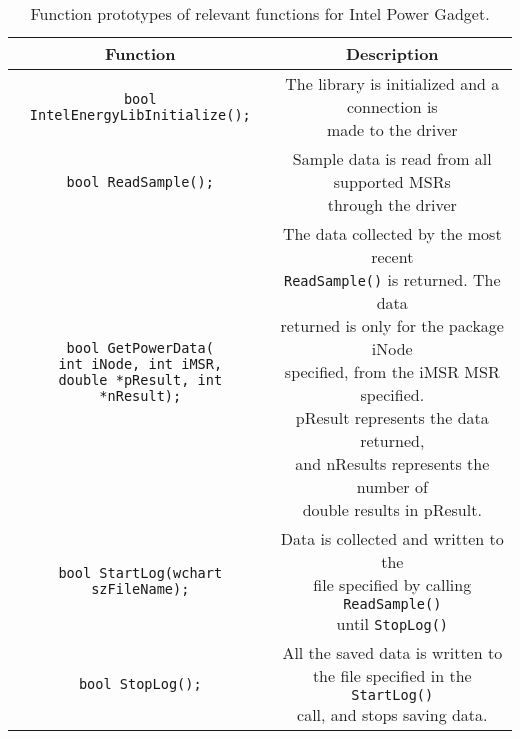 \begin{table}
    \centering
    \begin{tabular}{ || c | c ||}
        \hline
        \textbf{Function} & \textbf{Description} \\[0.5ex] \hline\hline
        \texttt{bool IntelEnergyLibInitialize();} &  \makecell{The library is initialized and a connection is\\made to the driver}  \\
        \hline
        \texttt{bool ReadSample();} &  \makecell{Sample data is read from all supported MSRs\\through the driver}  \\
        \hline
        \makecell{\texttt{bool GetPowerData(}\\ \texttt{int iNode, int iMSR,}\\ \texttt{double *pResult, int *nResult);}} &  \makecell{The data collected by the most recent\\\texttt{ReadSample()} is returned. The data\\returned is only for the package iNode\\specified, from the iMSR MSR specified.\\pResult represents the data returned,\\and nResults represents the number of\\double results in pResult.}  \\
        \hline
        \texttt{bool StartLog(wchart szFileName);} & \makecell{Data is collected and written to the\\file specified by calling \texttt{ReadSample()}\\until \texttt{StopLog()} }  \\
        \hline
        \texttt{bool StopLog();} &  \makecell{All the saved data is written to\\ the file specified in the \texttt{StartLog()}\\ call, and stops saving data.
        }  \\
        \hline
    \end{tabular}
    \caption{Function prototypes of relevant functions for Intel Power Gadget.}
    \label{tab:intel_power_gadget_functions}
\end{table}


